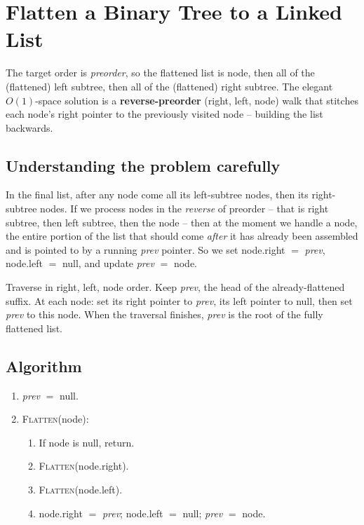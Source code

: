 \section{Flatten a Binary Tree to a Linked List}
\label{sec:trees-flatten}


\begin{patternbox}
The target order is \emph{preorder}, so the flattened list is node, then
all of the (flattened) left subtree, then all of the (flattened) right
subtree. The elegant $O(1)$-space solution is a \textbf{reverse-preorder}
(right, left, node) walk that stitches each node's right pointer to the
previously visited node -- building the list backwards.
\end{patternbox}

\subsection*{Understanding the problem carefully}

In the final list, after any node come all its left-subtree nodes, then its
right-subtree nodes. If we process nodes in the \emph{reverse} of preorder
-- that is right subtree, then left subtree, then the node -- then at the
moment we handle a node, the entire portion of the list that should come
\emph{after} it has already been assembled and is pointed to by a running
\textit{prev} pointer. So we set node.right $=$ \textit{prev}, node.left
$=$ null, and update \textit{prev} $=$ node.

\begin{ideabox}
Traverse in right, left, node order. Keep \textit{prev}, the head of the
already-flattened suffix. At each node: set its right pointer to
\textit{prev}, its left pointer to null, then set \textit{prev} to this
node. When the traversal finishes, \textit{prev} is the root of the fully
flattened list.
\end{ideabox}

\subsection*{Algorithm}

\begin{enumerate}
  \item \textit{prev} $=$ null.
  \item \textsc{Flatten}(node):
  \begin{enumerate}
    \item If node is null, return.
    \item \textsc{Flatten}(node.right).
    \item \textsc{Flatten}(node.left).
    \item node.right $=$ \textit{prev}; node.left $=$ null; \textit{prev}
          $=$ node.
  \end{enumerate}
\end{enumerate}

